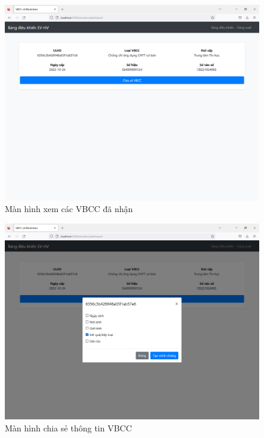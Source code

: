 \begin{figure}[H]
\centering
\includegraphics[width=.9\linewidth]{img/sv_hva.PNG}
\caption{Màn hình xem các VBCC đã nhận}
\label{fig:sv_hva}
\end{figure}

\begin{figure}[H]
\centering
\includegraphics[width=.9\linewidth]{img/sv_chiase.PNG}
\caption{Màn hình chia sẻ thông tin VBCC}
\label{fig:sv_chiase}
\end{figure}

